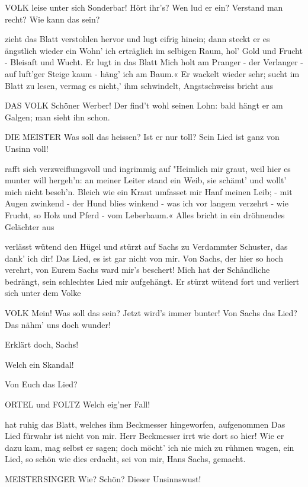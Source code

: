 \begin{drama}
VOLK
leise unter sich
Sonderbar! Hört ihr's? Wen lud er ein?
Verstand man recht? Wie kann das sein?

\Beckmesserspeaks
zieht das Blatt verstohlen hervor und lugt eifrig hinein; dann steckt er es ängstlich wieder ein
Wohn' ich erträglich im selbigen Raum,
hol' Gold und Frucht - Bleisaft und Wucht.
Er lugt in das Blatt
Mich holt am Pranger - der Verlanger -
auf luft'ger Steige kaum - häng' ich am Baum.«
Er wackelt wieder sehr; sucht im Blatt zu lesen, vermag es nicht,' ihm schwindelt, Angstschweiss bricht aus

DAS VOLK
Schöner Werber! Der find't wohl seinen Lohn:
bald hängt er am Galgen; man sieht ihn schon.

DIE MEISTER
Was soll das heissen?
Ist er nur toll?
Sein Lied ist ganz von Unsinn voll!

\Beckmesserspeaks
rafft sich verzweiflungsvoll und ingrimmig auf
"Heimlich mir graut,
weil hier es munter will hergeh'n:
an meiner Leiter stand ein Weib,
sie schämt' und wollt' mich nicht beseh'n.
Bleich wie ein Kraut
umfasset mir Hanf meinen Leib; -
mit Augen zwinkend - der Hund blies winkend -
was ich vor langem verzehrt -
wie Frucht, so Holz und Pferd -
vom Leberbaum.«
Alles bricht in ein dröhnendes Gelächter aus

\Beckmesserspeaks
verlässt wütend den Hügel und stürzt auf Sachs zu
Verdammter Schuster, das dank' ich dir!
Das Lied, es ist gar nicht von mir.
Von Sachs, der hier so hoch verehrt,
von Eurem Sachs ward mir's beschert!
Mich hat der Schändliche bedrängt,
sein schlechtes Lied mir aufgehängt.
Er stürzt wütend fort und verliert sich unter dem Volke

VOLK
Mein! Was soll das sein? Jetzt wird's immer bunter!
Von Sachs das Lied? Das nähm' uns doch wunder!

\Kothnerspeaks
Erklärt doch, Sachs!

\Nachtigallspeaks
Welch ein Skandal!

\Vogelgesangspeaks
Von Euch das Lied?

ORTEL und FOLTZ
Welch eig'ner Fall!

\Sachsspeaks
hat ruhig das Blatt, welches ihm Beckmesser hingeworfen, aufgenommen
Das Lied fürwahr ist nicht von mir.
Herr Beckmesser irrt wie dort so hier!
Wie er dazu kam, mag selbst er sagen;
doch möcht' ich nie mich zu rühmen wagen,
ein Lied, so schön wie dies erdacht,
sei von mir, Hans Sachs, gemacht.

MEISTERSINGER
Wie? Schön? Dieser Unsinnswust!


\end{drama}
